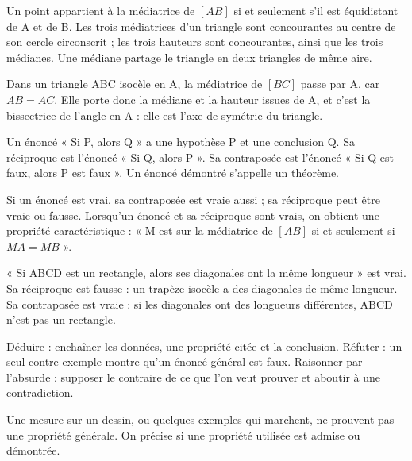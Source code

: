 \begin{propriete}Un point appartient à la médiatrice de $[AB]$ si et seulement s’il est équidistant de A et de B. Les trois médiatrices d’un triangle sont concourantes au centre de son cercle circonscrit ; les trois hauteurs sont concourantes, ainsi que les trois médianes. Une médiane partage le triangle en deux triangles de même aire.\end{propriete}
\begin{exemple}Dans un triangle ABC isocèle en A, la médiatrice de $[BC]$ passe par A, car $AB=AC$. Elle porte donc la médiane et la hauteur issues de A, et c’est la bissectrice de l’angle en A : elle est l’axe de symétrie du triangle.\end{exemple}
\clearpage
{}\label{cours-12-2}
\begin{definition}Un énoncé « Si P, alors Q » a une hypothèse P et une conclusion Q. Sa réciproque est l’énoncé « Si Q, alors P ». Sa contraposée est l’énoncé « Si Q est faux, alors P est faux ». Un énoncé démontré s’appelle un théorème.\end{definition}
\begin{propriete}Si un énoncé est vrai, sa contraposée est vraie aussi ; sa réciproque peut être vraie ou fausse. Lorsqu’un énoncé et sa réciproque sont vrais, on obtient une propriété caractéristique : « M est sur la médiatrice de $[AB]$ si et seulement si $MA=MB$ ».\end{propriete}
\begin{exemple}« Si ABCD est un rectangle, alors ses diagonales ont la même longueur » est vrai. Sa réciproque est fausse : un trapèze isocèle a des diagonales de même longueur. Sa contraposée est vraie : si les diagonales ont des longueurs différentes, ABCD n’est pas un rectangle.\end{exemple}
\begin{savoirfaire}Déduire : enchaîner les données, une propriété citée et la conclusion. Réfuter : un seul contre-exemple montre qu’un énoncé général est faux. Raisonner par l’absurde : supposer le contraire de ce que l’on veut prouver et aboutir à une contradiction.\end{savoirfaire}
\begin{attention}Une mesure sur un dessin, ou quelques exemples qui marchent, ne prouvent pas une propriété générale. On précise si une propriété utilisée est admise ou démontrée.\end{attention}

